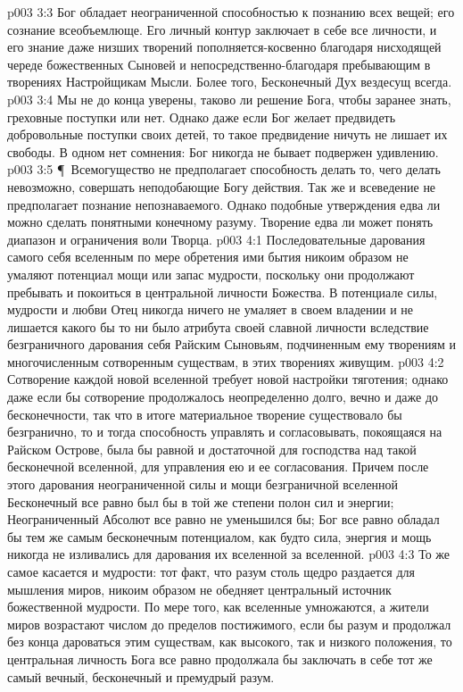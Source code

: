 \vs p003 3:3 Бог обладает неограниченной способностью к познанию всех вещей; его сознание всеобъемлюще. Его личный контур заключает в себе все личности, и его знание даже низших творений пополняется\hyp{}косвенно благодаря нисходящей череде божественных Сыновей и непосредственно\hyp{}благодаря пребывающим в творениях Настройщикам Мысли. Более того, Бесконечный Дух вездесущ всегда.
\vs p003 3:4 Мы не до конца уверены, таково ли решение Бога, чтобы заранее знать, греховные поступки или нет. Однако даже если Бог желает предвидеть добровольные поступки своих детей, то такое предвидение ничуть не лишает их свободы. В одном нет сомнения: Бог никогда не бывает подвержен удивлению.
\vs p003 3:5 \P\ Всемогущество не предполагает способность делать то, чего делать невозможно, совершать неподобающие Богу действия. Так же и всеведение не предполагает познание непознаваемого. Однако подобные утверждения едва ли можно сделать понятными конечному разуму. Творение едва ли может понять диапазон и ограничения воли Творца.
\vs p003 4:1 Последовательные дарования самого себя вселенным по мере обретения ими бытия никоим образом не умаляют потенциал мощи или запас мудрости, поскольку они продолжают пребывать и покоиться в центральной личности Божества. В потенциале силы, мудрости и любви Отец никогда ничего не умаляет в своем владении и не лишается какого бы то ни было атрибута своей славной личности вследствие безграничного дарования себя Райским Сыновьям, подчиненным ему творениям и многочисленным сотворенным существам, в этих творениях живущим.
\vs p003 4:2 Сотворение каждой новой вселенной требует новой настройки тяготения; однако даже если бы сотворение продолжалось неопределенно долго, вечно и даже до бесконечности, так что в итоге материальное творение существовало бы безгранично, то и тогда способность управлять и согласовывать, покоящаяся на Райском Острове, была бы равной и достаточной для господства над такой бесконечной вселенной, для управления ею и ее согласования. Причем после этого дарования неограниченной силы и мощи безграничной вселенной Бесконечный все равно был бы в той же степени полон сил и энергии; Неограниченный Абсолют все равно не уменьшился бы; Бог все равно обладал бы тем же самым бесконечным потенциалом, как будто сила, энергия и мощь никогда не изливались для дарования их вселенной за вселенной.
\vs p003 4:3 То же самое касается и мудрости: тот факт, что разум столь щедро раздается для мышления миров, никоим образом не обедняет центральный источник божественной мудрости. По мере того, как вселенные умножаются, а жители миров возрастают числом до пределов постижимого, если бы разум и продолжал без конца дароваться этим существам, как высокого, так и низкого положения, то центральная личность Бога все равно продолжала бы заключать в себе тот же самый вечный, бесконечный и премудрый разум.
